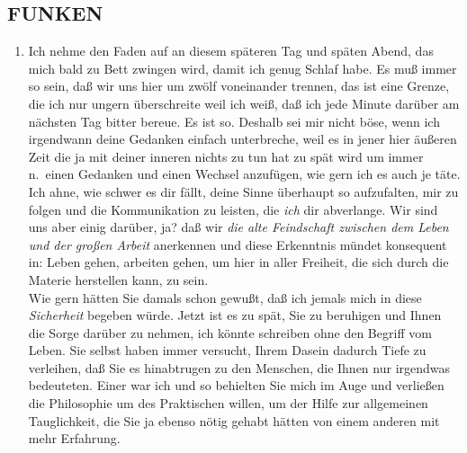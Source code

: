 \documentclass[
]{article}
\author{}
\date{\vspace{-2.5em}}
\providecommand{\tightlist}{%
  \setlength{\itemsep}{0pt}\setlength{\parskip}{0pt}}
\begin{document}
\subsection{FUNKEN}\label{funken}

\begin{enumerate}
\def\labelenumi{\alph{enumi}.}
\setcounter{enumi}{1}
\tightlist
\item
  Ich nehme den Faden auf an diesem späteren Tag und späten Abend, das
  mich bald zu Bett zwingen wird, damit ich genug Schlaf habe. Es muß
  immer so sein, daß wir uns hier um zwölf voneinander trennen, das ist
  eine Grenze, die ich nur ungern überschreite weil ich weiß, daß ich
  jede Minute darüber am nächsten Tag bitter bereue. Es ist so. Deshalb
  sei mir nicht böse, wenn ich irgendwann deine Gedanken einfach
  unterbreche, weil es in jener hier äußeren Zeit die ja mit deiner
  inneren nichts zu tun hat zu spät wird um immer n.~einen Gedanken und
  einen Wechsel anzufügen, wie gern ich es auch je täte. Ich ahne, wie
  schwer es dir fällt, deine Sinne überhaupt so aufzufalten, mir zu
  folgen und die Kommunikation zu leisten, die \emph{ich} dir
  abverlange. Wir sind uns aber einig darüber, ja? daß wir \emph{die
  alte Feindschaft zwischen dem Leben und der großen Arbeit }anerkennen
  und diese Erkenntnis mündet konsequent in: Leben gehen, arbeiten
  gehen, um hier in aller Freiheit, die sich durch die Materie
  herstellen kann, zu sein.\\
  Wie gern hätten Sie damals schon gewußt, daß ich jemals mich in diese
  \emph{Sicherheit} begeben würde. Jetzt ist es zu spät, Sie zu
  beruhigen und Ihnen die Sorge darüber zu nehmen, ich könnte schreiben
  ohne den Begriff vom Leben. Sie selbst haben immer versucht, Ihrem
  Dasein dadurch Tiefe zu verleihen, daß Sie es hinabtrugen zu den
  Menschen, die Ihnen nur irgendwas bedeuteten. Einer war ich und so
  behielten Sie mich im Auge und verließen die Philosophie um des
  Praktischen willen, um der Hilfe zur allgemeinen Tauglichkeit, die Sie
  ja ebenso nötig gehabt hätten von einem anderen mit mehr Erfahrung.
\end{enumerate}
\end{document}
